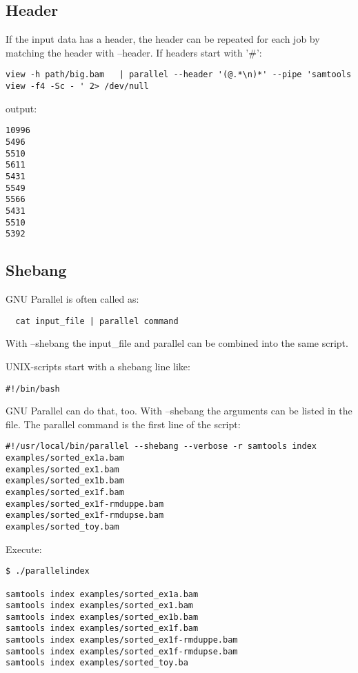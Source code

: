 \documentclass{article}
\begin{document}
\subsection{Header}
If the input data has a header, the header can be repeated for each job by matching the header with --header. If headers start with '\#':
\begin{lstlisting}
view -h path/big.bam   | parallel --header '(@.*\n)*' --pipe 'samtools view -f4 -Sc - ' 2> /dev/null 
\end{lstlisting}
output:
\begin{lstlisting}
10996
5496
5510
5611
5431
5549
5566
5431
5510
5392
\end{lstlisting}

\subsection{Shebang}
GNU Parallel is often called as:
\begin{lstlisting}
  cat input_file | parallel command
\end{lstlisting}
With --shebang the input\_file and parallel can be combined into the same script.

UNIX-scripts start with a shebang line like:
\begin{lstlisting}
#!/bin/bash
\end{lstlisting}

GNU Parallel can do that, too. With --shebang the arguments can be listed in the file. The parallel command is the first line of the script:
\begin{lstlisting}
#!/usr/local/bin/parallel --shebang --verbose -r samtools index
examples/sorted_ex1a.bam
examples/sorted_ex1.bam
examples/sorted_ex1b.bam
examples/sorted_ex1f.bam
examples/sorted_ex1f-rmduppe.bam
examples/sorted_ex1f-rmdupse.bam
examples/sorted_toy.bam
\end{lstlisting}

Execute:
\begin{lstlisting}
$ ./parallelindex

samtools index examples/sorted_ex1a.bam
samtools index examples/sorted_ex1.bam
samtools index examples/sorted_ex1b.bam
samtools index examples/sorted_ex1f.bam
samtools index examples/sorted_ex1f-rmduppe.bam
samtools index examples/sorted_ex1f-rmdupse.bam
samtools index examples/sorted_toy.ba
\end{lstlisting}
\end{document}
